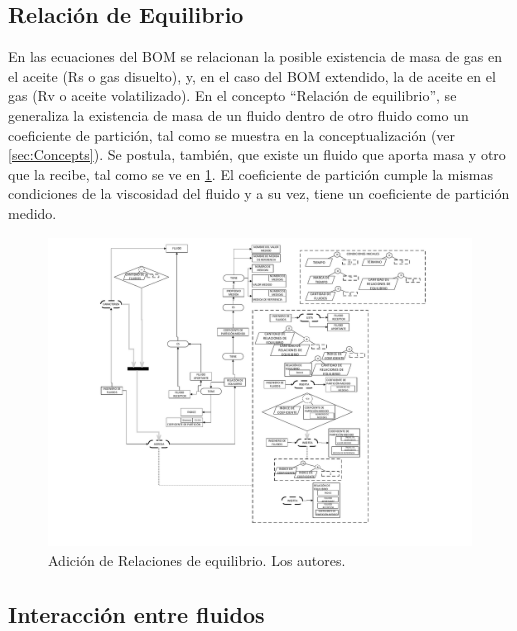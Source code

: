 \subsection{Relación de Equilibrio}\label{sec:PS_Equilibrium}
En las ecuaciones del BOM se relacionan la posible existencia de masa de gas en el aceite (Rs o gas disuelto), y, en el caso del BOM extendido, la de aceite en el gas (Rv o aceite volatilizado). En el concepto ``Relación de equilibrio'', se generaliza la existencia de masa de un fluido dentro de otro fluido como un coeficiente de partición, tal como se muestra en la conceptualización (ver \ref{sec:Concepts}). Se postula, también, que existe un fluido que aporta masa y otro que la recibe, tal como se ve en \ref{fig:EqRelation}. El coeficiente de partición cumple la mismas condiciones de la viscosidad del fluido y a su vez, tiene un coeficiente de partición medido. 

\begin{figure}[b]
	\centering%
	\includegraphics[width=0.9\linewidth]{Fig/Equilibrium.pdf}%
	\caption{Adición de Relaciones de equilibrio. Los autores.} \label{fig:EqRelation}
\end{figure}

\subsection{Interacción entre fluidos}\label{sec:PS_Interphase}
%

